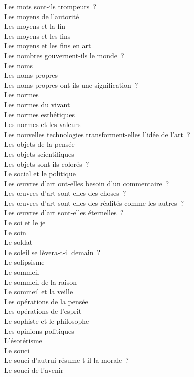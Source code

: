 \documentclass[a4paper,12pt]{article}
\begin{document}
Les mots sont-ils trompeurs ? \\
Les moyens de l'autorité \\
Les moyens et la fin \\
Les moyens et les fins \\
Les moyens et les fins en art \\
Les nombres gouvernent-ils le monde ? \\
Les noms \\
Les noms propres \\
Les noms propres ont-ils une signification ? \\
Les normes \\
Les normes du vivant \\
Les normes esthétiques \\
Les normes et les valeurs \\
Les nouvelles technologies transforment-elles l'idée de l'art ? \\
Les objets de la pensée \\
Les objets scientifiques \\
Les objets sont-ils colorés ? \\
Le social et le politique \\
Les œuvres d'art ont-elles besoin d'un commentaire ? \\
Les œuvres d'art sont-elles des choses ? \\
Les œuvres d'art sont-elles des réalités comme les autres ? \\
Les œuvres d'art sont-elles éternelles ? \\
Le soi et le je \\
Le soin \\
Le soldat \\
Le soleil se lèvera-t-il demain ? \\
Le solipsisme \\
Le sommeil \\
Le sommeil de la raison \\
Le sommeil et la veille \\
Les opérations de la pensée \\
Les opérations de l'esprit \\
Le sophiste et le philosophe \\
Les opinions politiques \\
L'ésotérisme \\
Le souci \\
Le souci d'autrui résume-t-il la morale ? \\
Le souci de l'avenir \\
\end{document}
